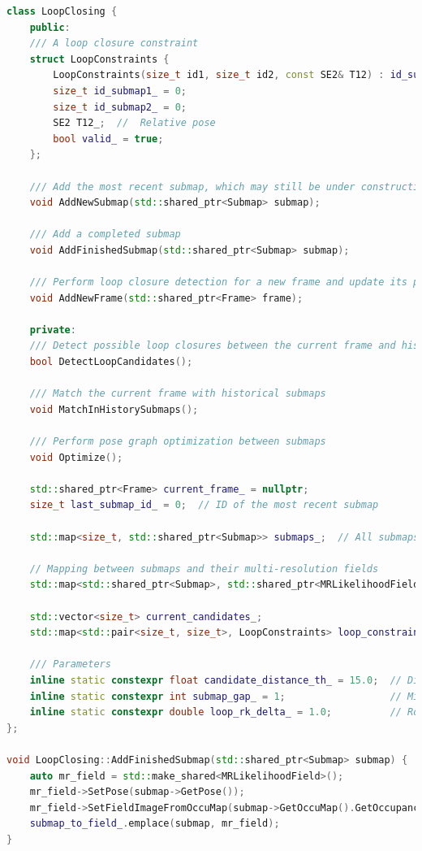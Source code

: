 \begin{lstlisting}[language=c++,caption=src/ch6/loop_closing.cc]
class LoopClosing {
	public:
	/// A loop closure constraint
	struct LoopConstraints {
		LoopConstraints(size_t id1, size_t id2, const SE2& T12) : id_submap1_(id1), id_submap2_(id2), T12_(T12) {}
		size_t id_submap1_ = 0;
		size_t id_submap2_ = 0;
		SE2 T12_;  //  Relative pose
		bool valid_ = true;
	};
	
	/// Add the most recent submap, which may still be under construction
	void AddNewSubmap(std::shared_ptr<Submap> submap);
	
	/// Add a completed submap
	void AddFinishedSubmap(std::shared_ptr<Submap> submap);
	
	/// Perform loop closure detection for a new frame and update its pose and submap poses
	void AddNewFrame(std::shared_ptr<Frame> frame);
	
	private:
	/// Detect possible loop closures between the current frame and historical maps
	bool DetectLoopCandidates();
	
	/// Match the current frame with historical submaps
	void MatchInHistorySubmaps();
	
	/// Perform pose graph optimization between submaps
	void Optimize();
	
	std::shared_ptr<Frame> current_frame_ = nullptr;
	size_t last_submap_id_ = 0;  // ID of the most recent submap
	
	std::map<size_t, std::shared_ptr<Submap>> submaps_;  // All submaps
	
	// Mapping between submaps and their multi-resolution fields
	std::map<std::shared_ptr<Submap>, std::shared_ptr<MRLikelihoodField>> submap_to_field_;
	
	std::vector<size_t> current_candidates_;                                 // Potential loop closure candidates
	std::map<std::pair<size_t, size_t>, LoopConstraints> loop_constraints_;  // Loop constraints indexed by constrained submap pairs
	
	/// Parameters
	inline static constexpr float candidate_distance_th_ = 15.0;  // Distance threshold between candidate frame and submap center
	inline static constexpr int submap_gap_ = 1;                  // Minimum submap index difference for loop closure
	inline static constexpr double loop_rk_delta_ = 1.0;          // Robust kernel threshold for loop closure
};

void LoopClosing::AddFinishedSubmap(std::shared_ptr<Submap> submap) {
	auto mr_field = std::make_shared<MRLikelihoodField>();
	mr_field->SetPose(submap->GetPose());
	mr_field->SetFieldImageFromOccuMap(submap->GetOccuMap().GetOccupancyGrid());
	submap_to_field_.emplace(submap, mr_field);
}


\end{lstlisting}
